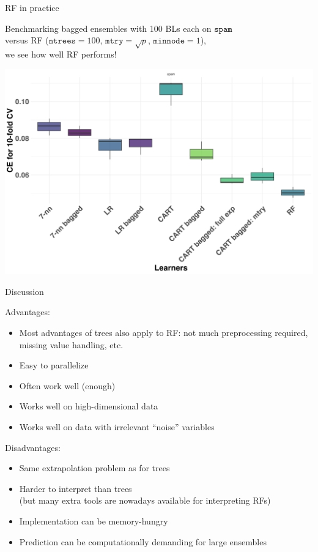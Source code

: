 \documentclass[11pt,compress,t,notes=noshow, xcolor=table]{beamer}
\begin{document}
\begin{vbframe}{RF in practice}

Benchmarking bagged ensembles with 100 BLs each on $\texttt{spam}$ \\
versus RF ($\texttt{ntrees} = 100$, $\texttt{mtry} = \sqrt{p}$, $\texttt{minnode} = 1$), \\
we see how well RF performs!

\begin{center}
\includegraphics[clip=true, trim={0 35 0 30}, width=0.9\linewidth]{figure/bagging-bench_RF.png}
\end{center}

\end{vbframe}

\begin{vbframe}{Discussion}

Advantages:
\begin{itemize}
  \item Most advantages of trees also apply to RF: not much preprocessing required, missing value handling, etc.
  \item Easy to parallelize
  \item Often work well (enough)
  \item Works well on high-dimensional data
  \item Works well on data with irrelevant \enquote{noise} variables
\end{itemize}

\lz

Disadvantages:
\begin{itemize}
  \item Same extrapolation problem as for trees
  \item Harder to interpret than trees \\
    (but many extra tools are nowadays
    available for interpreting RFs)
  \item Implementation can be memory-hungry
  \item Prediction can be computationally demanding for large ensembles
\end{itemize}

\end{vbframe}

\endlecture
\end{document}

